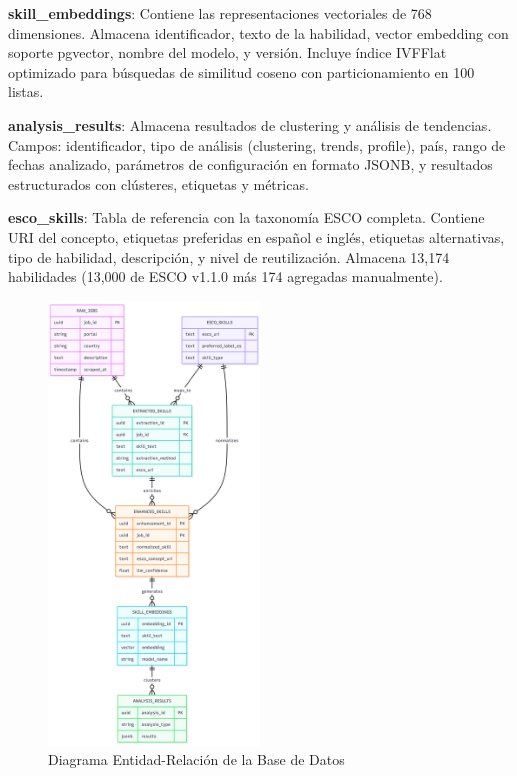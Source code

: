 \textbf{skill\_embeddings}: Contiene las representaciones vectoriales de 768 dimensiones. Almacena identificador, texto de la habilidad, vector embedding con soporte pgvector, nombre del modelo, y versión. Incluye índice IVFFlat optimizado para búsquedas de similitud coseno con particionamiento en 100 listas.

\textbf{analysis\_results}: Almacena resultados de clustering y análisis de tendencias. Campos: identificador, tipo de análisis (clustering, trends, profile), país, rango de fechas analizado, parámetros de configuración en formato JSONB, y resultados estructurados con clústeres, etiquetas y métricas.

\textbf{esco\_skills}: Tabla de referencia con la taxonomía ESCO completa. Contiene URI del concepto, etiquetas preferidas en español e inglés, etiquetas alternativas, tipo de habilidad, descripción, y nivel de reutilización. Almacena 13,174 habilidades (13,000 de ESCO v1.1.0 más 174 agregadas manualmente).

\begin{figure}[H]
\centering
\includegraphics[width=0.5\textwidth]{diagrams/DiagramaER.png}
\caption{Diagrama Entidad-Relación de la Base de Datos}
\label{fig:diagrama-er}
\end{figure}

